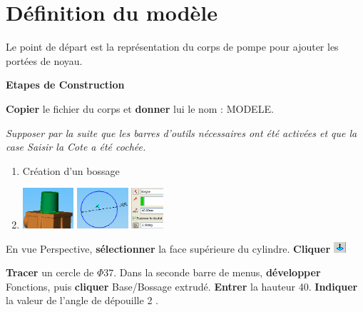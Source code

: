 

\section{Définition du modèle}

Le point de départ est la représentation du corps de pompe pour ajouter les portées de noyau. 

\textbf{Etapes de Construction}

\textbf{Copier} le fichier du corps et \textbf{donner} lui le nom : MODELE. 

\textit{Supposer par la suite que les barres d'outils nécessaires ont été activées et que la case \og Saisir la Cote \fg a été cochée.}

\begin{enumerate}
 \item Création d'un bossage
 \item \includegraphics[height=1.5cm]{img/SW-000.png}
 \includegraphics[height=1.5cm]{img/SW-001.png}
\includegraphics[height=1.5cm]{img/SW-002.png}
\end{enumerate}

En vue Perspective, \textbf{sélectionner} la face supérieure du cylindre. \textbf{Cliquer} \includegraphics[height=0.4cm]{img/SW-003.png}

\textbf{Tracer} un cercle de $\Phi 37$. 
Dans la seconde barre de menus, \textbf{développer} Fonctions, puis \textbf{cliquer} Base/Bossage extrudé. 
\textbf{Entrer} la hauteur 40. \textbf{Indiquer} la valeur de l'angle de dépouille 2 \textdegree.


